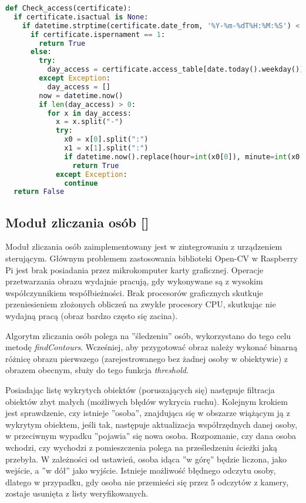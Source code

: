 {\footnotesize 
	\begin{lstlisting}[caption={Funkcja Check-access urządzenia sterującego}, label={lst:RPI check access}, language=Python]
def Check_access(certificate):
  if certificate.isactual is None:
    if datetime.strptime(certificate.date_from, '%Y-%m-%dT%H:%M:%S') < datetime.now() < datetime.strptime( certificate.date_to, '%Y-%m-%dT%H:%M:%S'):
      if certificate.ispernament == 1:
        return True
      else:
        try:
          day_access = certificate.access_table[date.today().weekday()].split(";")
        except Exception:
          day_access = []
        now = datetime.now()
        if len(day_access) > 0:
          for x in day_access:
            x = x.split("-")
            try:
              x0 = x[0].split(":")
              x1 = x[1].split(":")
              if datetime.now().replace(hour=int(x0[0]), minute=int(x0[1])) <= now < datetime.now().replace(hour=int(x1[0]), minute=int(x1[1])):
                return True
            except Exception:
              continue
  return False
	\end{lstlisting}}

\subsection{Moduł zliczania osób [\StudentA]}
	Moduł zliczania osób zaimplementowany jest w zintegrowaniu z urządzeniem sterującym. Głównym problemem zastosowania biblioteki Open-CV w Raspberry Pi jest brak posiadania przez mikrokomputer karty graficznej. Operacje przetwarzania obrazu wydajnie pracują, gdy wykonywane są z wysokim współczynnikiem współbieżności. Brak procesorów graficznych skutkuje przeniesieniem złożonych obliczeń na zwykłe procesory CPU, skutkując nie wydajną pracą (obraz bardzo często się zacina). 
	
	Algorytm zliczania osób polega na ''śledzeniu'' osób, wykorzystano do tego celu metodę \textit{findContours}. Wcześniej, aby przygotować obraz należy wykonać binarną różnicę obrazu pierwszego (zarejestrowanego bez żadnej osoby w obiektywie) z obrazem obecnym, służy do tego funkcja \textit{threshold}. 
	
	Posiadając listę wykrytych obiektów (poruszających się) następuje filtracja obiektów zbyt małych (możliwych błędów wykrycia ruchu). Kolejnym krokiem jest sprawdzenie, czy istnieje ''osoba'', znajdująca się w obszarze wiążącym ją z wykrytym obiektem, jeśli tak, następuje aktualizacja współrzędnych danej osoby, w przeciwnym wypadku ''pojawia'' się nowa osoba. Rozpoznanie, czy dana osoba wchodzi, czy wychodzi z pomieszczenia polega na prześledzeniu ścieżki jaką przebyła. W zależności od ustawień, osoba idąca ''w górę'' będzie liczona, jako wejście, a ''w dół'' jako wyjście. Istnieje możliwość błędnego odczytu osoby, dlatego w przypadku, gdy osoba nie przemieści się przez 5 odczytów z kamery, zostaje usunięta z listy weryfikowanych. \cite{rozpoznawanie_twarzy}